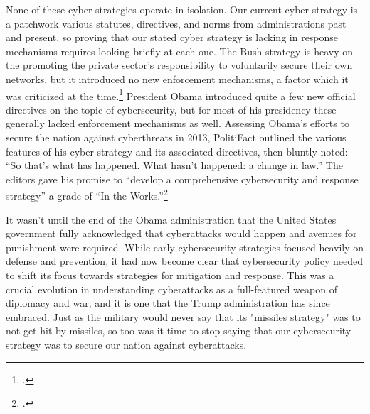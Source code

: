 \documentclass{memoir}
\begin{document}
\begin{refsegment}
None of these cyber strategies operate in isolation. Our current cyber strategy is a patchwork various statutes, directives, and norms from administrations past and present, so proving that our stated cyber strategy is lacking in response mechanisms requires looking briefly at each one. The Bush strategy is heavy on the promoting the private sector's responsibility to voluntarily secure their own networks, but it introduced no new enforcement mechanisms, a factor which it was criticized at the time.\footcite{lemos_bush_2003} President Obama introduced quite a few new official directives on the topic of cybersecurity, but for most of his presidency these generally lacked enforcement mechanisms as well. Assessing Obama's efforts to secure the nation against cyberthreats in 2013, PolitiFact outlined the various features of his cyber strategy and its associated directives, then bluntly noted: ``So that's what has happened. What hasn't happened: a change in law.'' The editors gave his promise to ``develop a comprehensive cybersecurity and response strategy'' a grade of ``In the Works.''\footcite{moorhead_work_2013}

It wasn't until the end of the Obama administration that the United States government fully acknowledged that  cyberattacks would happen and avenues for punishment were required. While early cybersecurity strategies focused heavily on defense and prevention, it had now become clear that cybersecurity policy needed to shift its focus towards strategies for mitigation and response. This was a crucial evolution in understanding cyberattacks as a full-featured weapon of diplomacy and war, and it is one that the Trump administration has since embraced. Just as the military would never say that its "missiles strategy" was to not get hit by missiles, so too was it time to stop saying that our cybersecurity strategy was to secure our nation against cyberattacks.


\end{refsegment}
\end{document}

